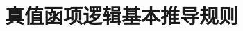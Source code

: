 \fi

\label{ProofRules}
\newpage\section{真值函项逻辑基本推导规则}

\newlength{\mathemwd}
\def\mathem{{\hbox to\mathemwd{}}}

\ifHTMLtarget\else
\renewenvironment{fitchproof}
	{\noindent\par\noindent\small$\begin{nd}}
	{\end{nd}$\noindent\normalsize\ignorespacesafterend}
\fi



